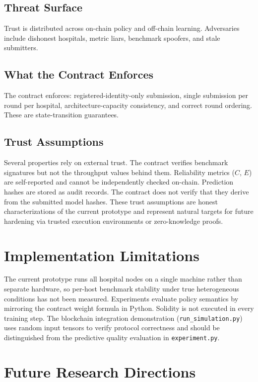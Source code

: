 \documentclass[conference]{IEEEtran}
\begin{document}
\subsection{Threat Surface}

Trust is distributed across on-chain policy and off-chain learning. Adversaries include dishonest hospitals, metric liars, benchmark spoofers, and stale submitters.

\subsection{What the Contract Enforces}

The contract enforces: registered-identity-only submission, single submission per round per hospital, architecture-capacity consistency, and correct round ordering. These are state-transition guarantees.

\subsection{Trust Assumptions}

Several properties rely on external trust. The contract verifies benchmark signatures but not the throughput values behind them. Reliability metrics ($C$, $E$) are self-reported and cannot be independently checked on-chain. Prediction hashes are stored as audit records. The contract does not verify that they derive from the submitted model hashes. These trust assumptions are honest characterizations of the current prototype and represent natural targets for future hardening via trusted execution environments or zero-knowledge proofs.

\section{Implementation Limitations}

The current prototype runs all hospital nodes on a single machine rather than separate hardware, so per-host benchmark stability under true heterogeneous conditions has not been measured. Experiments evaluate policy semantics by mirroring the contract weight formula in Python. Solidity is not executed in every training step. The blockchain integration demonstration (\texttt{run\_simulation.py}) uses random input tensors to verify protocol correctness and should be distinguished from the predictive quality evaluation in \texttt{experiment.py}.

\section{Future Research Directions}
\end{document}
